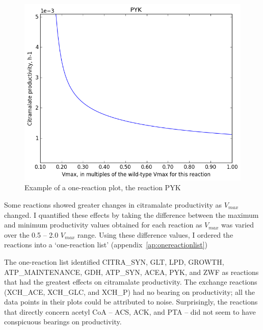\documentclass[parskip=full, numbers=noenddot]{scrreprt}
\begin{document}

\begin{figure}[h]
  \centering
  \includegraphics[scale=0.5]{onereacsample}
  \caption{Example of a one-reaction plot, the reaction PYK}
  \label{fig:onereacsample}
\end{figure}

Some reactions showed greater changes in citramalate productivity as $V_{max}$ changed. I quantified these effects by taking the difference between the maximum and minimum productivity values obtained for each reaction as $V_{max}$ was varied over the 0.5 -- 2.0 $V_{max}$ range.  Using these difference values, I ordered the reactions into a `one-reaction list' (appendix~\ref{ap:onereactionlist})

The one-reaction list identified CITRA\_SYN, GLT, LPD, GROWTH, ATP\_MAIN\-TEN\-ANCE, GDH, ATP\_SYN, ACEA, PYK, and ZWF as reactions that had the greatest effects on citramalate productivity.
The exchange reactions (XCH\_ACE, XCH\_GLC, and XCH\_P) had no bearing on productivity; all the data points in their plots could be attributed to noise. Surprisingly, the reactions that directly concern acetyl CoA -- ACS, ACK, and PTA -- did not seem to have conspicuous bearings on productivity.
\end{document}
